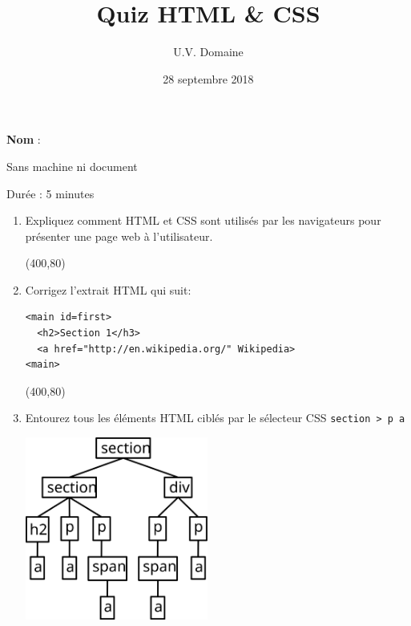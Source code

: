 \documentclass[a4paper, 12pt]{article}
\title{Quiz HTML \& CSS}
\author{U.V. Domaine}
\date{28 septembre 2018}
\begin{document}
\maketitle

\textbf{Nom} :

Sans machine ni document

Durée : 5 minutes

\vspace{1cm}

\begin{enumerate}
\item Expliquez comment HTML et CSS sont utilisés par les navigateurs pour
  présenter une page web à l'utilisateur.

  \framebox(400,80){}

\item Corrigez l'extrait HTML qui suit:
\begin{lstlisting}
<main id=first>
  <h2>Section 1</h3>
  <a href="http://en.wikipedia.org/" Wikipedia>
<main>
\end{lstlisting}

\framebox(400,80){}

\item Entourez tous les éléments HTML ciblés par le sélecteur CSS
  \lstinline{section > p a}

  \vspace{.2in}
  \includegraphics[width=6cm,keepaspectratio]{quiz1-tree}

\end{enumerate}
\end{document}
